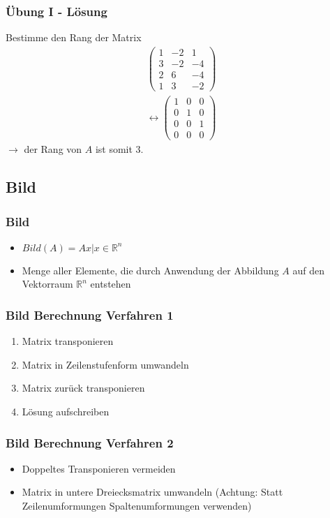 \begin{frame}
	\frametitle{Übung I - Lösung}
	Bestimme den Rang der Matrix
	\begin{align*}
		\begin{pmatrix}
			1 & -2 & 1 \\
			3 & -2 & -4 \\
			2 & 6 & -4 \\
			1 & 3 & -2 
		\end{pmatrix} \\
		\leftrightarrow
		\begin{pmatrix}
			1 & 0 & 0 \\
			0 & 1 & 0 \\
			0 & 0 & 1 \\
			0 & 0 & 0
		\end{pmatrix} 
	\end{align*}
	$\rightarrow$ der Rang von $A$ ist somit $3$.
\end{frame}


\subsection{Bild}
\begin{frame}
    \frametitle{Bild}
    \begin{itemize}
        \item $Bild(A)={Ax | x\in \mathbb{R}^n}$
        \item Menge aller Elemente, die durch Anwendung der Abbildung $A$ auf den Vektorraum $\mathbb{R}^n$ entstehen
    \end{itemize}
\end{frame}

\begin{frame}
    \frametitle{Bild Berechnung Verfahren 1}
    \begin{enumerate}
        \item Matrix transponieren
		\item Matrix in Zeilenstufenform umwandeln
		\item Matrix zurück transponieren
		\item Lösung aufschreiben
    \end{enumerate}
\end{frame}

\begin{frame}
    \frametitle{Bild Berechnung Verfahren 2}
    \begin{itemize}
        \item Doppeltes Transponieren vermeiden
		\item Matrix in untere Dreiecksmatrix umwandeln (Achtung: Statt Zeilenumformungen Spaltenumformungen verwenden)
    \end{itemize}
\end{frame}

